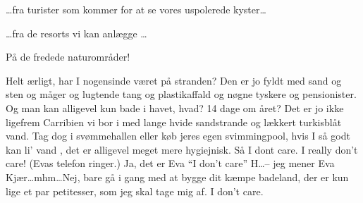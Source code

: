 \documentclass[a4paper,11pt]{article}
\begin{document}
\begin{sketch}
 \ldots fra turister som kommer for at se vores uspolerede kyster\ldots

 \ldots fra de resorts vi kan anlægge \ldots

  På de fredede naturområder!

 Helt ærligt, har I nogensinde været på stranden? Den er jo fyldt med sand og sten og måger og lugtende tang og plastikaffald og nøgne tyskere og pensionister. Og man kan alligevel kun bade i havet, hvad? 14 dage om året? Det er jo ikke ligefrem Carribien vi bor i med lange hvide sandstrande og lækkert turkisblåt vand. Tag dog i svømmehallen eller køb jeres egen svimmingpool, hvis I så godt kan li’ vand , det er alligevel meget mere hygiejnisk. Så I dont care. I really don’t care! (Evas telefon ringer.) Ja, det er Eva ``I don’t care'' H\ldots -- jeg  mener Eva Kjær\ldots mhm\ldots Nej, bare gå i gang med at bygge dit kæmpe badeland, der er kun lige et par petitesser, som jeg skal tage mig af.  I don’t care. 



\end{sketch}
\end{document}
